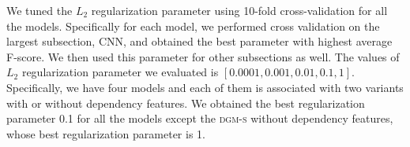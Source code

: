 We tuned the $L_{2}$ regularization parameter using 10-fold cross-validation for all the models. 
Specifically for each model, we performed cross validation on the largest subsection, CNN, and obtained the best parameter with highest average F-score. 
We then used this parameter for other subsections as well. 
The values of $L_{2}$ regularization parameter we evaluated is $[0.0001, 0.001, 0.01, 0.1, 1]$. Specifically, we have four models and each of them is associated with two variants with or without dependency features. 
We obtained the best regularization parameter 0.1 for all the models except the \textsc{dgm-s} without dependency features, whose best regularization parameter is 1. 


%


